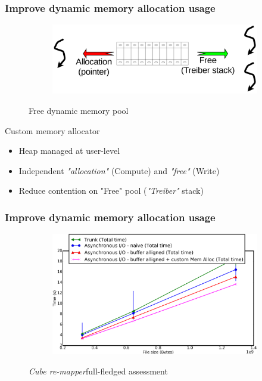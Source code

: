 \documentclass[slidestop,xcolor=dvipsnames, notes=hide]{beamer}
\newcommand{\toolTargetSoftware}			{\emph{Cube re-mapper}}
\begin{document}
		\begin{frame}
			\frametitle{Improve dynamic memory allocation usage}
			\begin{figure}[!h]
				\centering
				\begin{subfigure}[b]{0.7\textwidth}
					\centering
					\includegraphics[width=\textwidth]{images/internship_juelich_customMemAlloc_freePool.png}
				\end{subfigure}
				\caption[Free dynamic memory pool]
				{\small Free dynamic memory pool}
			\end{figure}

			\begin{block}{Custom memory allocator}
			\begin{itemize}
				\item Heap managed at user-level
				\item Independent \emph{"allocation"} (Compute) and \emph{"free"} (Write)
				\item Reduce contention on "Free" pool (\emph{"Treiber"} stack)
			\end{itemize}
			\end{block}
		\end{frame}


		\begin{frame}
			\frametitle{Improve dynamic memory allocation usage}
			\begin{figure}[!h]
				\centering
				\begin{subfigure}[b]{0.8\textwidth}
					\centering
					\includegraphics[width=\textwidth]{images/cubeRemapper_customMemAlloc_overall_time_hpc.png}
				\end{subfigure}
				\caption{\toolTargetSoftware\space full-fledged assessment}
			\end{figure}
		\end{frame}
\end{document}
